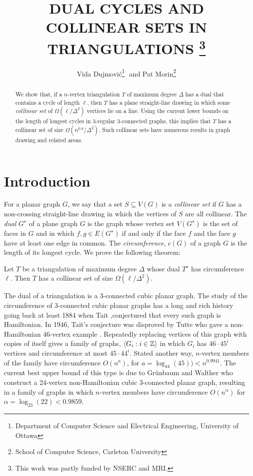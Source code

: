 \documentclass{patmorin}
\title{\MakeUppercase{Dual Cycles and Collinear Sets in Triangulations}%
    \thanks{This work was partly funded by NSERC and MRI.}}
\author{Vida Dujmovi\'c\thanks{Department of Computer Science and Electrical Engineering, University of Ottawa}\,\, and 
        Pat Morin\thanks{School of Computer Science, Carleton University}}
\newcommand{\dual}[1]{{#1}^\star}
\begin{document}
\maketitle


\begin{abstract}
   We show that, if a $n$-vertex triangulation $T$ of maximum degree
   $\Delta$ has a dual that contains a cycle of length $\ell$, then
   $T$ has a plane straight-line drawing in which some \emph{collinear
   set} of $\Omega(\ell/\Delta^2)$ vertices lie on a line.  Using the
   current lower bounds on the length of longest cycles in 3-regular
   3-connected graphs, this implies that $T$ has a collinear set of
   size $\Omega(n^{0.8}/\Delta^2)$.  Such collinear sets have numerous
   results in graph drawing and related areas.
\end{abstract}

\section{Introduction}

For a planar graph $G$, we say that a set $S\subseteq V(G)$ is
a \emph{collinear set} if $G$ has a non-crossing straight-line drawing in
which the vertices of $S$ are all collinear.  The \emph{dual} $\dual{G}$
of a plane graph $G$ is the graph whose vertex set $V(\dual{G})$ is
the set of faces in $G$ and in which $f,g\in E(\dual{G})$ if and only
if the face $f$ and the face $g$ have at least one edge in common.
The \emph{circumference}, $c(G)$ of a graph $G$ is the length of its
longest cycle. We prove the following theorem:

\begin{thm}
  Let $T$ be a triangulation of maximum degree $\Delta$ whose dual
  $\dual{T}$ has circumference $\ell$. Then $T$ has a collinear set of
  size $\Omega(\ell/\Delta^2)$.
\end{thm}

The dual of a triangulation is a 3-connected cubic planar graph.
The study of the circumference of 3-connected cubic planar graphs
has a long and rich history going back at least 1884 when Tait
\cite{tait:listings},conjectured that every such graph is Hamiltonian.  In
1946, Tait's conjecture was disproved by Tutte who gave a non-Hamiltonian
46-vertex example \cite{tutte:on}.  Repeatedly replacing vertices of
this graph with copies of itself gives a family of graphs, $\langle G_i:i\in
\mathbb{Z}\rangle$ in which $G_i$ has $46\cdot 45^i$ vertices and circumference at
most $45\cdot44^i$.  Stated another way, $n$-vertex members of the
family have circumference $O(n^a)$, for $a=\log_{44}(45)) < n^{0.9941}$.
The current best upper bound of this type is due to Gr\"unbaum and
Walther \cite{grunbaum.walther:shortness} who construct a 24-vertex
non-Hamiltonian cubic 3-connected planar graph, resulting in a family
of graphs in which $n$-vertex members have circumference $O(n^{\alpha})$
for $\alpha=\log_{23}(22)< 0.9859$.
\end{document}
